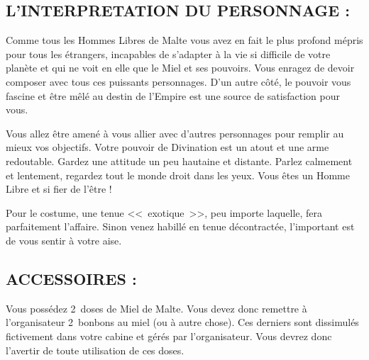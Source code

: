 \documentclass[14pt,twocolumn]{extarticle}
\begin{document}
\subsection{L'INTERPRETATION DU PERSONNAGE :}

Comme tous les Hommes Libres de Malte vous avez en fait le plus profond mépris
pour tous les étrangers, incapables de s'adapter à la vie si difficile de votre
planète et qui ne voit en elle que le Miel et ses pouvoirs. Vous enragez de
devoir composer avec tous ces puissants personnages. D'un autre côté, le
pouvoir vous fascine et être mêlé au destin de l'Empire est une source de
satisfaction pour vous. 

Vous allez être amené à vous allier avec d'autres personnages pour remplir au
mieux vos objectifs. Votre pouvoir de Divination est un atout et une arme
redoutable. Gardez une attitude un peu hautaine et distante. Parlez calmement
et lentement, regardez tout le monde droit dans les yeux. Vous êtes un Homme
Libre et si fier de l'être !

Pour le costume, une tenue <<~exotique~>>, peu importe laquelle, fera
parfaitement l'affaire. Sinon venez habillé en tenue décontractée, l'important
est de vous sentir à votre aise.

\subsection{ACCESSOIRES :}

Vous possédez 2~doses de Miel de Malte. Vous devez donc remettre à
l'organisateur 2~bonbons au miel (ou à autre chose). Ces derniers sont
dissimulés fictivement dans votre cabine et gérés par l'organisateur. Vous
devrez donc l'avertir de toute utilisation de ces doses. 
\end{document}
